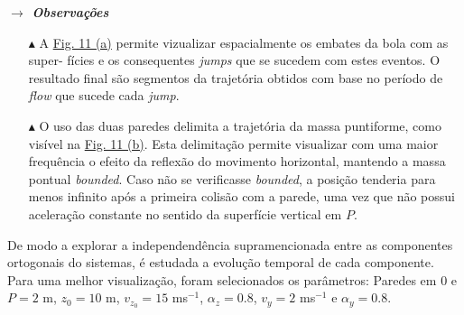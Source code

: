 \vspace{-1em}
\noindent\textbf{\textit{$\rightarrow$ Observações}}
\vspace{-0.5em}
\begin{itemize}
    \item[$\blacktriangle$] A \hyperref[fig:P4-3dPlot]{Fig. 11 (a)} permite vizualizar espacialmente os embates da bola com as super- fícies e os consequentes \textit{jumps} que se sucedem com estes eventos. O resultado final são segmentos da trajetória obtidos com base no período de \textit{flow} que sucede cada \textit{jump}.
    
    \item[$\blacktriangle$] O uso das duas paredes delimita a trajetória da massa puntiforme, como visível na \hyperref[fig:BouncingBallGif]{Fig. 11 (b)}. Esta delimitação permite visualizar com uma maior frequência o efeito da reflexão do movimento horizontal, mantendo a massa pontual \textit{bounded}. Caso não se verificasse \textit{bounded}, a posição tenderia para menos infinito após a primeira colisão com a parede, uma vez que não possui aceleração constante no sentido da superfície vertical em $P$.
\end{itemize}

\noindent De modo a explorar a independendência supramencionada entre as componentes ortogonais do sistemas, é estudada a evolução temporal de cada componente. Para uma melhor visualização, foram selecionados os parâmetros: Paredes em $0$ e $P = 2$ m, $z_0 = 10$ m, $v_{z_0} = 15$ ms$^{-1}$, $\alpha_z = 0.8$, $v_y = 2$ ms$^{-1}$ e $\alpha_y = 0.8$.

